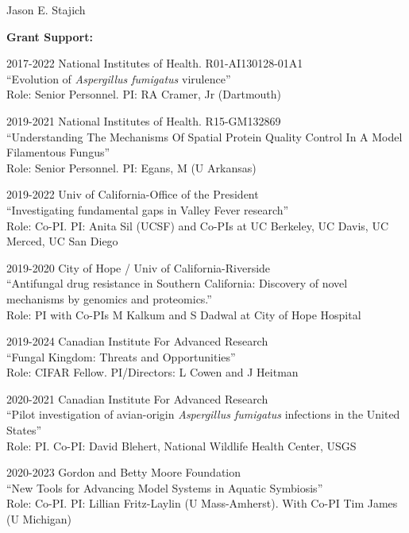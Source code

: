 \documentclass[10pt]{article}
\begin{document}
\begin{cv}{\centerline{Jason E. Stajich}}
\begin{cvlistcompact}{\bf Grant Support:}
\item [2017-2022] National Institutes of Health. R01-AI130128-01A1 \\
  ``Evolution of \textit{Aspergillus fumigatus} virulence'' \\
Role: Senior Personnel. PI: RA Cramer, Jr (Dartmouth)

\item [2019-2021] National Institutes of Health. R15-GM132869 \\
  ``Understanding The Mechanisms Of Spatial Protein Quality Control In
  A Model Filamentous Fungus'' \\
Role: Senior Personnel. PI: Egans, M (U Arkansas)

\item [2019-2022] Univ of California-Office of the President \\
``Investigating fundamental gaps in Valley Fever research'' \\
Role: Co-PI.  PI: Anita Sil (UCSF) and Co-PIs at UC Berkeley, UC
Davis, UC Merced, UC San Diego

\item [2019-2020] City of Hope / Univ of California-Riverside \\
``Antifungal drug resistance in Southern California: Discovery of
  novel mechanisms by genomics and proteomics.'' \\
Role: PI with Co-PIs M Kalkum and S Dadwal at City of Hope Hospital

\item [2019-2024] Canadian Institute For Advanced Research \\
  ``Fungal Kingdom: Threats and Opportunities'' \\
Role: CIFAR Fellow. PI/Directors: L Cowen and J Heitman

\item [2020-2021] Canadian Institute For Advanced Research \\
  ``Pilot investigation of avian-origin \textit{Aspergillus fumigatus} infections
in the United States'' \\
Role: PI. Co-PI: David Blehert, National Wildlife Health Center, USGS

\item [2020-2023] Gordon and Betty Moore Foundation \\
  ``New Tools for Advancing Model Systems in Aquatic Symbiosis''  \\
Role: Co-PI. PI: Lillian Fritz-Laylin (U Mass-Amherst). With Co-PI Tim James (U Michigan)


\end{cvlistcompact}
\end{cv}
\end{document}
